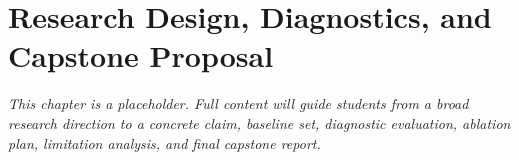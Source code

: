 \chapter{Research Design, Diagnostics, and Capstone Proposal}
\label{ch:research-capstone}


\textit{This chapter is a placeholder. Full content will guide students from a broad research direction to a concrete claim, baseline set, diagnostic evaluation, ablation plan, limitation analysis, and final capstone report.}
